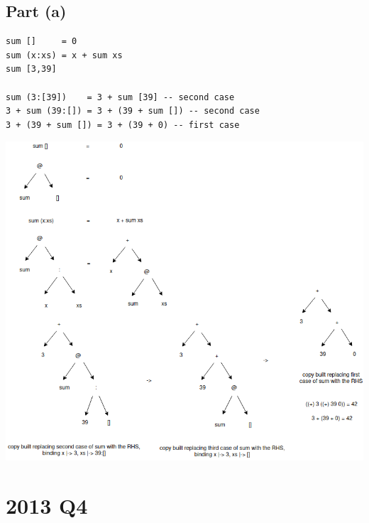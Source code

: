 \documentclass[11pt]{article}
\begin{document}
\subsection{Part (a)}
\label{sec:orge4a781f}
\begin{verbatim}
sum []     = 0
sum (x:xs) = x + sum xs
sum [3,39]

sum (3:[39])    = 3 + sum [39] -- second case
3 + sum (39:[]) = 3 + (39 + sum []) -- second case
3 + (39 + sum []) = 3 + (39 + 0) -- first case
\end{verbatim}
\begin{center}
\includegraphics[width=160mm]{./sum-xs.png}
\end{center}
\newpage
\section{2013 Q4}
\label{sec:org4a3a311}
\end{document}
